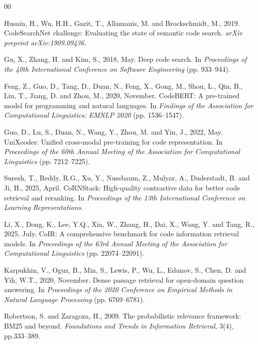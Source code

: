 \documentclass[conference]{IEEEtran}
\begin{document}
\begin{thebibliography}{00}

Husain, H., Wu, H.H., Gazit, T., Allamanis, M. and Brockschmidt, M., 2019.
CodeSearchNet challenge: Evaluating the state of semantic code search.
\textit{arXiv preprint arXiv:1909.09436}.

Gu, X., Zhang, H. and Kim, S., 2018, May. Deep code search. In
\textit{Proceedings of the 40th International Conference on Software
Engineering} (pp. 933--944).

Feng, Z., Guo, D., Tang, D., Duan, N., Feng, X., Gong, M., Shou, L., Qin, B.,
Liu, T., Jiang, D. and Zhou, M., 2020, November. CodeBERT: A pre-trained model
for programming and natural languages. In \textit{Findings of the Association
for Computational Linguistics: EMNLP 2020} (pp. 1536--1547).

Guo, D., Lu, S., Duan, N., Wang, Y., Zhou, M. and Yin, J., 2022, May.
UniXcoder: Unified cross-modal pre-training for code representation. In
\textit{Proceedings of the 60th Annual Meeting of the Association for
Computational Linguistics} (pp. 7212--7225).

Suresh, T., Reddy, R.G., Xu, Y., Nussbaum, Z., Mulyar, A., Duderstadt, B. and
Ji, H., 2025, April. CoRNStack: High-quality contrastive data for better code
retrieval and reranking. In \textit{Proceedings of the 13th International
Conference on Learning Representations}.

Li, X., Dong, K., Lee, Y.Q., Xia, W., Zhang, H., Dai, X., Wang, Y. and Tang, R.,
2025, July. CoIR: A comprehensive benchmark for code information retrieval
models. In \textit{Proceedings of the 63rd Annual Meeting of the Association
for Computational Linguistics} (pp. 22074--22091).

Karpukhin, V., Oguz, B., Min, S., Lewis, P., Wu, L., Edunov, S., Chen, D. and
Yih, W.T., 2020, November. Dense passage retrieval for open-domain question
answering. In \textit{Proceedings of the 2020 Conference on Empirical Methods in
Natural Language Processing} (pp. 6769--6781).

Robertson, S. and Zaragoza, H., 2009. The probabilistic relevance framework:
BM25 and beyond. \textit{Foundations and Trends in Information Retrieval},
3(4), pp.333--389.


\end{thebibliography}
\end{document}
